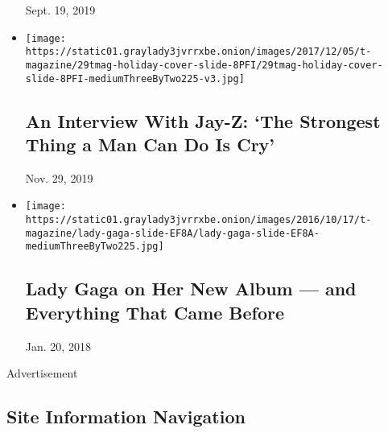 \begin{itemize}
  Sept. 19, 2019
\item
  \href{https://www.nytimes3xbfgragh.onion/interactive/2017/11/29/t-magazine/jay-z-dean-baquet-interview.html}{}

  \texttt{[image: https://static01.graylady3jvrrxbe.onion/images/2017/12/05/t-magazine/29tmag-holiday-cover-slide-8PFI/29tmag-holiday-cover-slide-8PFI-mediumThreeByTwo225-v3.jpg]}

  \hypertarget{an-interview-with-jay-z-the-strongest-thing-a-man-can-do-is-cry}{%
  \subsection{An Interview With Jay-Z: `The Strongest Thing a Man Can Do
  Is
  Cry'}\label{an-interview-with-jay-z-the-strongest-thing-a-man-can-do-is-cry}}

  Nov. 29, 2019
\item
  \href{https://www.nytimes3xbfgragh.onion/2016/10/17/t-magazine/lady-gaga-joanne.html}{}

  \texttt{[image: https://static01.graylady3jvrrxbe.onion/images/2016/10/17/t-magazine/lady-gaga-slide-EF8A/lady-gaga-slide-EF8A-mediumThreeByTwo225.jpg]}

  \hypertarget{lady-gaga-on-her-new-album--and-everything-that-came-before}{%
  \subsection{Lady Gaga on Her New Album --- and Everything That Came
  Before}\label{lady-gaga-on-her-new-album--and-everything-that-came-before}}

  Jan. 20, 2018
\end{itemize}

Advertisement

\hypertarget{site-information-navigation}{%
\subsection{Site Information
Navigation}\label{site-information-navigation}}

